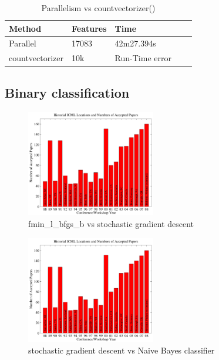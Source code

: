 \documentclass{article}
\begin{document}
\begin{table}[H]
\caption{Parallelism vs countvectorizer()}
\label{sample-table}
\begin{center}
\begin{small}
\begin{sc}
\begin{tabular}{lllll}
\hline
Method & Features & Time \\
\hline
Parallel  & 17083 & 42m27.394s \\
countvectorizer  & 10k & Run-Time error \\
\hline
\end{tabular}
\end{sc}
\end{small}
\end{center}
\end{table}


\subsection{Binary classification}


\begin{figure}[H]
  \caption{fmin\_l\_bfgs\_b vs stochastic gradient descent}
  \centering
    \includegraphics[width=0.5\textwidth]{icml_numpapers}
\end{figure}


\begin{figure}[H]
  \caption{stochastic gradient descent vs Naive Bayes classifier}
  \centering
    \includegraphics[width=0.5\textwidth]{icml_numpapers}
\end{figure}
\end{document}
